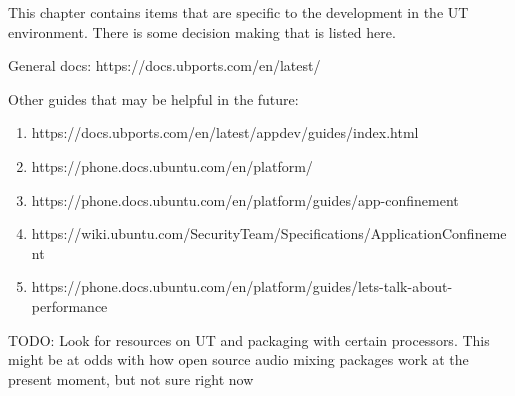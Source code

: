 This chapter contains items that are specific to the development in the UT environment. There is some decision making that is listed here.


General docs:
https://docs.ubports.com/en/latest/


Other guides that may be helpful in the future:
\begin{enumerate}
	\item https://docs.ubports.com/en/latest/appdev/guides/index.html
	\item https://phone.docs.ubuntu.com/en/platform/
	\item https://phone.docs.ubuntu.com/en/platform/guides/app-confinement
	\item https://wiki.ubuntu.com/SecurityTeam/Specifications/ApplicationConfinement
	\item https://phone.docs.ubuntu.com/en/platform/guides/lets-talk-about-performance
\end{enumerate}


TODO: Look for resources on UT and packaging with certain processors. This might be at odds with how open source audio mixing packages work at the present moment, but not sure right now